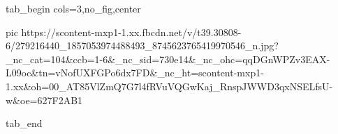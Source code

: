  
 
 
 
 


\ifcmt
  tab_begin cols=3,no_fig,center

     pic https://scontent-mxp1-1.xx.fbcdn.net/v/t39.30808-6/279216440_1857053974488493_8745623765419970546_n.jpg?_nc_cat=104&ccb=1-6&_nc_sid=730e14&_nc_ohc=qqDGnWPZv3EAX-L09oc&tn=vNofUXFGPo6dx7FD&_nc_ht=scontent-mxp1-1.xx&oh=00_AT85VlZmQ7G7l4fRVuVQGwKaj_RnspJWWD3qxNSELfsU-w&oe=627F2AB1

  tab_end
\fi
